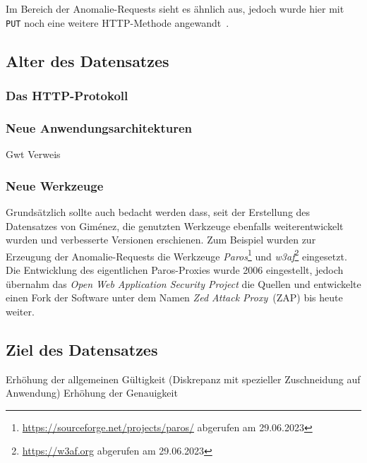 Im Bereich der Anomalie-Requests sieht es ähnlich aus, jedoch wurde hier mit \verb=PUT= noch eine weitere HTTP-Methode angewandt~\cite{csic2010}. 

\subsection{Alter des Datensatzes}

\subsubsection{Das HTTP-Protokoll}

\subsubsection{Neue Anwendungsarchitekturen}

Gwt Verweis\cite{kozik2019}

\subsubsection{Neue Werkzeuge}

Grundsätzlich sollte auch bedacht werden dass, seit der Erstellung des Datensatzes von Giménez, die genutzten Werkzeuge ebenfalls weiterentwickelt wurden und verbesserte Versionen erschienen. Zum Beispiel wurden zur Erzeugung der Anomalie-Requests die Werkzeuge \emph{Paros}\footnote{\url{https://sourceforge.net/projects/paros/} abgerufen am 29.06.2023} und \emph{w3af}\footnote{\url{https://w3af.org} abgerufen am 29.06.2023} eingesetzt. Die Entwicklung des eigentlichen Paros-Proxies wurde 2006 eingestellt, jedoch übernahm das \emph{Open Web Application Security Project} die Quellen und entwickelte einen Fork der Software unter dem Namen \emph{Zed Attack Proxy}~(ZAP) bis heute weiter. 
  
\subsection{Ziel des Datensatzes}

Erhöhung der allgemeinen Gültigkeit (Diskrepanz mit spezieller Zuschneidung auf Anwendung)
Erhöhung der Genauigkeit


